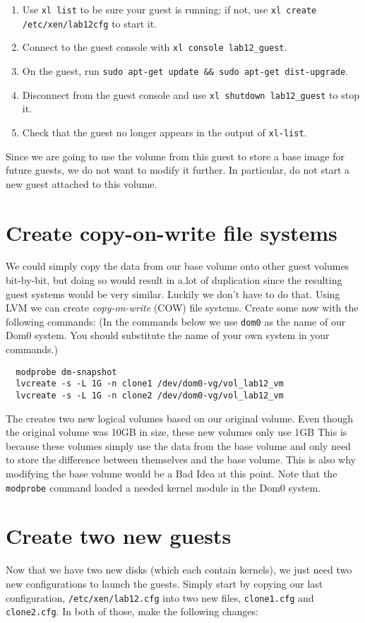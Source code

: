 \documentclass{article}
\begin{document}
\begin{enumerate}
  \item Use \texttt{xl list} to be sure your guest is running; if not, use \texttt{xl create /etc/xen/lab12cfg} to start it.
  \item Connect to the guest console with \texttt{xl console lab12\_guest}.
  \item On the guest, run \texttt{sudo apt-get update \&\& sudo apt-get dist-upgrade}.
  \item Disconnect from the guest console and use \texttt{xl shutdown lab12\_guest} to stop it.
  \item Check that the guest no longer appears in the output of \texttt{xl-list}.
\end{enumerate}

Since we are going to use the volume from this guest to store a base image for future guests, we do not want to modify it further. In particular, do not start a new guest 
attached to this volume.

\section{Create copy-on-write file systems}
We could simply copy the data from our base volume onto other guest volumes bit-by-bit, but doing so would result in a.lot of duplication since the resulting guest systems would be very similar. Luckily we don't have to do that. Using LVM we can create \emph{copy-on-write} (COW) file systems. Create some now with the following  commands: (In the commands below we use \texttt{dom0} as the name of our Dom0 system. You should substitute the name of your own system in your commands.)

\begin{verbatim}
  modprobe dm-snapshot
  lvcreate -s -L 1G -n clone1 /dev/dom0-vg/vol_lab12_vm  
  lvcreate -s -L 1G -n clone2 /dev/dom0-vg/vol_lab12_vm
\end{verbatim}

The creates two new logical volumes based on our original volume. Even though the original volume was 10GB in size, these new volumes only use 1GB This is because these volumes simply use the data from the base volume and only need to store the difference between themselves and the base volume. This is also why modifying the base volume would be a Bad Idea at this point. Note that the \texttt{modprobe} command loaded a needed kernel module in the Dom0 system.

\section{Create two new guests}
Now that we have two new disks (which each contain kernels), we just need two new configurations to launch the guests. Simply start by copying our last configuration, \texttt{/etc/xen/lab12.cfg} into two new files, \texttt{clone1.cfg} and \texttt{clone2.cfg}. In both of those, make the following changes:
\end{document}
